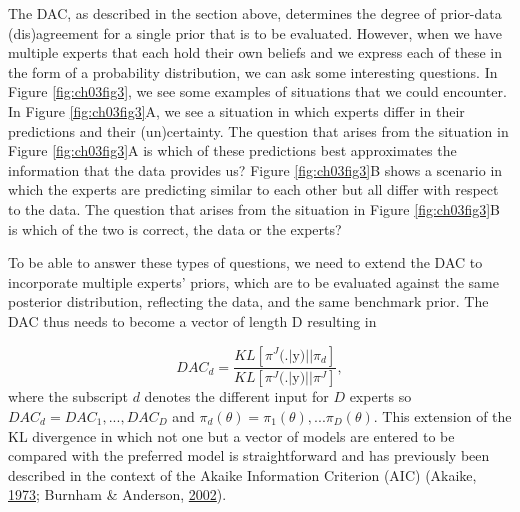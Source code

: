 \documentclass[openright,titlepage,12pt,a4paper]{book}
\begin{document}
The DAC, as described in the section above, determines the degree of prior-data (dis)agreement for a single prior that is to be evaluated. However, when we have multiple experts that each hold their own beliefs and we express each of these in the form of a probability distribution, we can ask some interesting questions. In Figure \ref{fig:ch03fig3}, we see some examples of situations that we could encounter. In Figure \ref{fig:ch03fig3}A, we see a situation in which experts differ in their predictions and their (un)certainty. The question that arises from the situation in Figure \ref{fig:ch03fig3}A is which of these predictions best approximates the information that the data provides us? Figure \ref{fig:ch03fig3}B shows a scenario in which the experts are predicting similar to each other but all differ with respect to the data. The question that arises from the situation in Figure \ref{fig:ch03fig3}B is which of the two is correct, the data or the experts?

To be able to answer these types of questions, we need to extend the DAC to incorporate multiple experts' priors, which are to be evaluated against the same posterior distribution, reflecting the data, and the same benchmark prior. The DAC thus needs to become a vector of length D resulting in

\begin{equation} 
DAC_d = \frac{KL[\pi^J(.|\textrm{y})||\pi_d]}{KL[\pi^J(.|\textrm{y})||\pi^J]},
\label{eq:ch03eq3}
\end{equation}
where the subscript \(d\) denotes the different input for \(D\) experts so \(DAC_d = DAC_1,...,DAC_D\) and \(\pi_d(\theta) = \pi_1(\theta),...\pi_D(\theta)\). This extension of the KL divergence in which not one but a vector of models are entered to be compared with the preferred model is straightforward and has previously been described in the context of the Akaike Information Criterion (AIC) (Akaike, \protect\hyperlink{ref-akaike_information_1973}{1973}; Burnham \& Anderson, \protect\hyperlink{ref-burnham_model_2002}{2002}).
\end{document}
